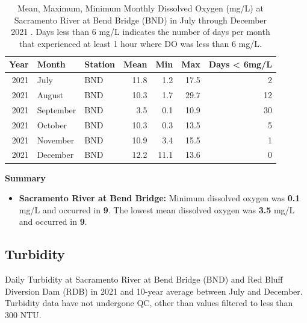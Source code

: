 \documentclass[
]{book}
\providecommand{\tightlist}{%
  \setlength{\itemsep}{0pt}\setlength{\parskip}{0pt}}
\theoremstyle{definition}
\theoremstyle{definition}
\theoremstyle{definition}
\theoremstyle{definition}
\theoremstyle{remark}
\begin{document}
\begin{table}
\centering
\caption{Mean, Maximum, Minimum Monthly Dissolved Oxygen (mg/L) at Sacramento River at Bend Bridge (BND) in July through December 2021 . Days less than 6 mg/L indicates the number of days per month that experienced at least 1 hour where DO was less than 6 mg/L.}
\centering
\begin{tabular}[t]{rllrrrr}
\hline
Year & Month & Station & Mean & Min & Max & Days < 6mg/L\\
\hline
2021 & July & BND & 11.8 & 1.2 & 17.5 & 2\\
\hline
2021 & August & BND & 10.3 & 1.7 & 29.7 & 12\\
\hline
2021 & September & BND & 3.5 & 0.1 & 10.9 & 30\\
\hline
2021 & October & BND & 10.3 & 0.3 & 13.5 & 5\\
\hline
2021 & November & BND & 10.9 & 3.4 & 15.5 & 1\\
\hline
2021 & December & BND & 12.2 & 11.1 & 13.6 & 0\\
\hline
\end{tabular}
\end{table}

\textbf{Summary}

\begin{itemize}
\tightlist
\item
  \textbf{Sacramento River at Bend Bridge:} Minimum dissolved oxygen was \textbf{0.1} mg/L and occurred in \textbf{9}. The lowest mean dissolved oxygen was \textbf{3.5} mg/L and occurred in \textbf{9}.
\end{itemize}

\hypertarget{turbidity}{%
\subsection{Turbidity}\label{turbidity}}

\label{fig:TurbBNDRDB-fig}Daily Turbidity at Sacramento River at Bend Bridge (BND) and Red Bluff Diversion Dam (RDB) in 2021 and 10-year average between July and December. Turbidity data have not undergone QC, other than values filtered to less than 300 NTU.
\end{document}
